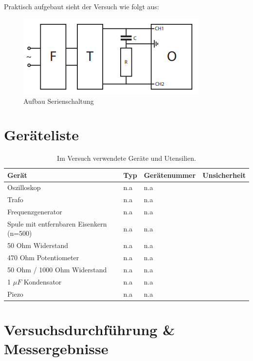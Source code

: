 \documentclass[12pt,a4paper,twoside]{article}
\begin{document}
\noindent
Praktisch aufgebaut sieht der Versuch wie folgt aus:

\begin{figure}[H]
    \centering
    \includegraphics[width=0.6\linewidth, angle=-90]{nudes/3.2 Schaltplan.png}
    \caption{Aufbau Serienschaltung}
    \label{fig:Aufbau Serienschaltung}
\end{figure}



\section{Geräteliste} %

    \begin{table}[H]
        \centering
        \caption{Im Versuch verwendete Geräte und Utensilien.}
        \label{tab:geraete}
        \begin{tabular}{| l | l | l | l |}
            \hline
            Gerät   & Typ   & Gerätenummer  & Unsicherheit \\
            \hline
            Oszilloskop & {n.a} & {n.a} \\
            Trafo & {n.a} & {n.a} \\
            Frequenzgenerator & {n.a} & {n.a} \\
            Spule mit entfernbaren Eisenkern (n=500) & {n.a} & {n.a} \\
            50 Ohm Widerstand & {n.a} & {n.a} \\
            470 Ohm Potentiometer & {n.a} & {n.a} \\
            50 Ohm / 1000 Ohm Widerstand & {n.a} & {n.a} \\
            1 $\mu F$ Kondensator& {n.a} & {n.a} \\
            Piezo & {n.a} & {n.a} \\
            \hline
        \end{tabular}
    \end{table}


\section{Versuchsdurchführung \& Messergebnisse} %
\end{document}
